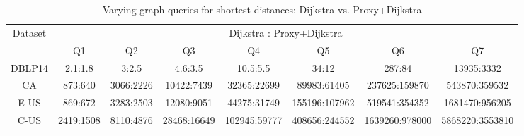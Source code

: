 \begin{table}[t!]
\label{tab:performance_dist_queries_dj}
\caption{Varying graph queries  for shortest distances: Dijkstra vs. Proxy+Dijkstra}
\vspace{-1ex}
\begin{center}
\begin{tabular}{|c|c|c|c|c|c|c|c|}
\hline

\multirow{2}{*}{Dataset} & \multicolumn{7}{c|}{Dijkstra : Proxy+Dijkstra} \\ \cline{2-8}
 & Q1 & Q2 & Q3 & Q4 & Q5 & Q6 &Q7  \\ \hline \hline
 DBLP14 & 2.1:1.8 & 3:2.5 & 4.6:3.5 & 10.5:5.5 & 34:12 & 287:84 & 13935:3332 \\ \hline
 CA & 873:640 & 3066:2226 & 10422:7439 & 32365:22699 & 89983:61405 & 237625:159870 & 543870:359532 \\ \hline
 E-US & 869:672 & 3283:2503 & 12080:9051 & 44275:31749 & 155196:107962 & 519541:354352 & 1681470:956205 \\ \hline
 C-US & 2419:1508 & 8110:4876 & 28468:16649 & 102945:59777 & 408656:244552& 1639260:978000 & 5868220:3553810 \\ \hline
\end{tabular}
\end{center}
\end{table}

